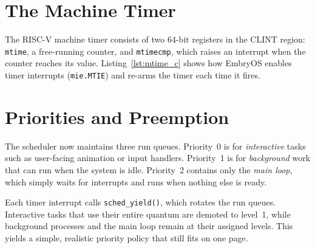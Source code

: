\begin{figure}[H]
\centering

\end{figure}

\begin{figure}[H]
\centering

\end{figure}

\section{The Machine Timer}

The RISC-V machine timer consists of two 64-bit registers in the CLINT region:
\texttt{mtime}, a free-running counter, and \texttt{mtimecmp}, which raises an
interrupt when the counter reaches its value.  Listing~\ref{lst:mtime_c} shows
how EmbryOS enables timer interrupts (\texttt{mie.MTIE}) and re-arms the timer
each time it fires.

\begin{figure}[H]
\centering

\end{figure}

\begin{figure}[H]
\centering

\end{figure}

\section{Priorities and Preemption}

The scheduler now maintains three run queues.  Priority~0 is for
\emph{interactive} tasks such as user-facing animation or input handlers.
Priority~1 is for \emph{background} work that can run when the system is idle.
Priority~2 contains only the \emph{main loop}, which simply waits for
interrupts and runs when nothing else is ready.

Each timer interrupt calls \texttt{sched\_yield()}, which rotates the run
queues.  Interactive tasks that use their entire quantum are demoted to level~1,
while background processes and the main loop remain at their assigned levels.
This yields a simple, realistic priority policy that still fits on one page.

